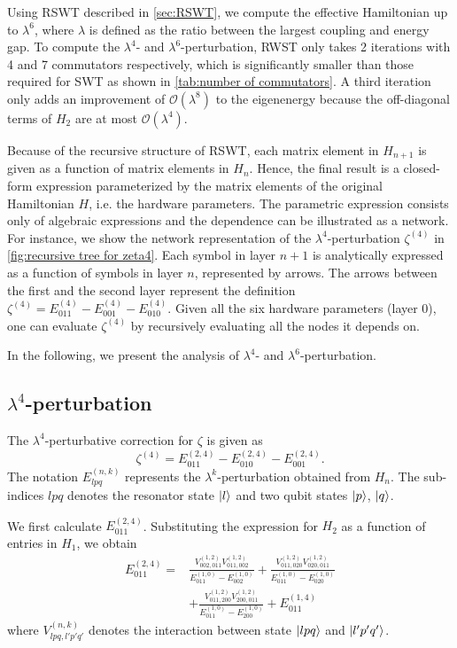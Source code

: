 \documentclass[%
 reprint,
 amsmath,amssymb,
 aps,
pra,
noeprint,
superscriptaddress,
]{revtex4-2}
\begin{document}
Using RSWT described in \cref{sec:RSWT}, we compute the effective Hamiltonian up to $\lambda^6$, where $\lambda$ is defined as the ratio between the largest coupling and energy gap.
To compute the $\lambda^4$- and $\lambda^6$-perturbation, RWST only takes 2 iterations with 4 and 7 commutators respectively, which is significantly smaller than those required for SWT as shown in \cref{tab:number of commutators}.
A third iteration only adds an improvement of $\mathcal{O}(\lambda^8)$ to the eigenenergy because the off-diagonal terms of $H_2$ are at most $\mathcal{O}(\lambda^4)$.

Because of the recursive structure of RSWT, each matrix element in $H_{n+1}$ is given as a function of matrix elements in $H_n$.
Hence, the final result is a closed-form expression parameterized by the matrix elements of the original Hamiltonian $H$, i.e. the hardware parameters.
The parametric expression consists only of algebraic expressions and the dependence can be illustrated as a network.
For instance, we show the network representation of the $\lambda^4$-perturbation $\zeta^{(4)}$ in \cref{fig:recursive tree for zeta4}.
Each symbol in layer $n+1$ is analytically expressed as a function of symbols in layer $n$, represented by arrows.
The arrows between the first and the second layer represent the definition $\zeta^{(4)}=E^{(4)}_{011}-E^{(4)}_{001}-E^{(4)}_{010}$.
Given all the six hardware parameters (layer 0), one can evaluate $\zeta^{(4)}$ by recursively evaluating all the nodes it depends on.

In the following, we present the analysis of $\lambda^4$- and $\lambda^6$-perturbation.

\subsection{$\lambda^4$-perturbation}
The $\lambda^4$-perturbative correction for $\zeta$ is given as
\begin{equation}
    \zeta^{(4)} = E_{011}^{(2,4)} - E_{010}^{(2,4)} - E_{001}^{(2,4)}
    .
\end{equation}
The notation $E_{lpq}^{(n,k)}$ represents the $\lambda^k$-perturbation obtained from $H_n$.
The sub-indices $lpq$ denotes the resonator state $\ket{l}$ and two qubit states $\ket{p}$, $\ket{q}$.

We first calculate $E_{011}^{(2,4)}$. Substituting the expression for $H_2$ as a function of entries in $H_1$, we obtain
\begin{align}
\label{eq:RSWT map H1 to H2}
    E_{011}^{(2,4)} =  &
    \frac{V_{002,011}^{(1,2)} V_{011,002}^{(1,2)}}{ E_{011}^{(1,0)} - E_{002}^{(1,0)}}
    +\frac{V_{011,020}^{(1,2)} V_{020,011}^{(1,2)}}{ E_{011}^{(1,0)} - E_{020}^{(1,0)}}
    \\ \nonumber&
    +\frac{V_{011,200}^{(1,2)} V_{200,011}^{(1,2)}}{ E_{011}^{(1,0)} - E_{200}^{(1,0)}}
    + E_{011}^{(1,4)}
\end{align}
where $V_{lpq,l'p'q'}^{(n,k)}$ denotes the interaction between state $\ket{lpq}$ and $\ket{l'p'q'}$.
\end{document}
